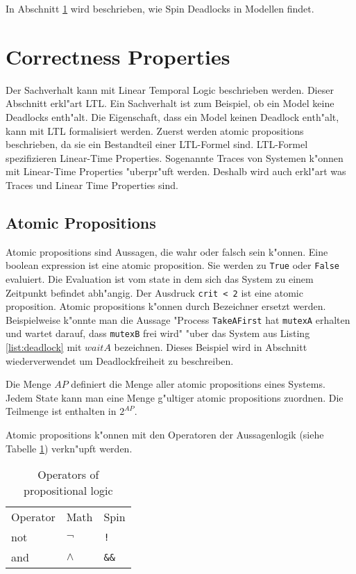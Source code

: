 \documentclass[a4paper, twoside]{article}
\begin{document}
In Abschnitt \ref{sec:ltl} wird beschrieben, wie Spin Deadlocks in Modellen findet.



\section{Correctness Properties}
\label{sec:ltl}

 Der Sachverhalt kann mit Linear Temporal Logic beschrieben werden. Dieser Abschnitt erkl"art LTL. Ein Sachverhalt ist zum Beispiel, ob ein Model keine Deadlocks enth"alt. Die Eigenschaft, dass ein Model keinen Deadlock enth"alt, kann mit LTL formalisiert werden. Zuerst werden atomic propositions beschrieben, da sie ein Bestandteil einer LTL-Formel sind. LTL-Formel spezifizieren Linear-Time Properties. Sogenannte Traces von Systemen k"onnen mit Linear-Time Properties "uberpr"uft werden. Deshalb wird auch erkl"art was Traces und Linear Time Properties sind.

\subsection{Atomic Propositions}
\label{sec:atomicpropositions}

Atomic propositions sind Aussagen, die wahr oder falsch sein k"onnen. Eine boolean expression ist eine atomic proposition. Sie werden zu \verb|True| oder \verb|False| evaluiert. Die Evaluation ist vom state in dem sich das System zu einem Zeitpunkt befindet abh"angig. Der Ausdruck \verb|crit < 2| ist eine atomic proposition. Atomic propositions k"onnen durch Bezeichner ersetzt werden. Beispielweise k"onnte man die Aussage "Process \verb|TakeAFirst| hat \verb|mutexA| erhalten und wartet darauf, dass \verb|mutexB| frei wird" "uber das 
System aus Listing \ref{list:deadlock} mit $waitA$ bezeichnen. Dieses Beispiel wird in Abschnitt wiederverwendet um Deadlockfreiheit zu beschreiben.

Die Menge $AP$ definiert die Menge aller atomic propositions eines Systems. Jedem State kann man eine Menge g"ultiger atomic propositions zuordnen. Die Teilmenge ist enthalten in $2^{AP}$.
 
Atomic propositions k"onnen mit den Operatoren der Aussagenlogik (siehe Tabelle \ref{tab:operators_of_propositionallogic}) verkn"upft werden.


\begin{table}
  \centering

  \begin{tabular}{l l l}
    Operator & Math & Spin \\
    not & $\neg$ & \verb|!| \\
    and & $\land$ & \verb|&&| \\
  \end{tabular}
  \caption{Operators of propositional logic }
  \label{tab:operators_of_propositionallogic}
\end{table}
\end{document}

